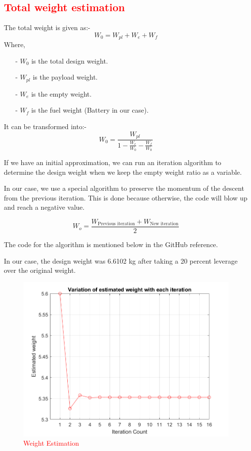 \documentclass[12 pt]{article}
\begin{document}

\subsection{\textcolor{red}{Total weight estimation}}

The total weight is given as:- 
$$ W_0 = W_{pl} + W_{e} + W_{f} $$
Where,
\begin{itemize}
    \item[-] $W_0$ is the total design weight.
    \item [-] $W_{pl}$ is the payload weight.
    \item [-] $W_{e}$ is the empty weight.
    \item [-] $W_{f}$ is the fuel weight (Battery in our case).
\end{itemize}

It can be transformed into:- 
$$W_{0} = \frac{W_{pl}}{1 - \frac{W_{e}}{W_{0}} - \frac{W_{f}}{W_0}}$$

If we have an initial approximation, we can run an iteration algorithm to determine the design weight when we keep the empty weight ratio as a variable.


In our case, we use a special algorithm to preserve the momentum of the descent from the previous iteration. This is done because otherwise, the code will blow up and reach a negative value. 

$$ W_o = \frac{ W_{\text{Previous iteration}} + W_{\text{New iteration}} }{2} $$

The code for the algorithm is mentioned below in the GitHub reference.

In our case, the design weight was 6.6102 kg after taking a 20 percent leverage over the original weight.

\begin{figure}
    \centering
    \includegraphics[width=0.75\linewidth]{Codes/Week 2/weight.png}
    \caption{\textcolor{red}{Weight Estimation}}
    \label{Weight Estimation}
\end{figure}
\end{document}

